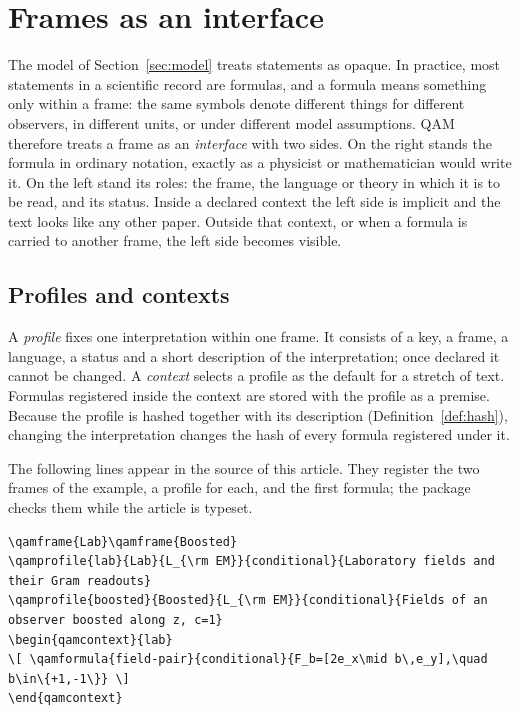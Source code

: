 \section{Frames as an interface}\label{sec:frames}

The model of Section~\ref{sec:model} treats statements as opaque. In practice, most statements in a scientific record are formulas,
and a formula means something only within a frame: the same symbols denote different things for different observers, in different
units, or under different model assumptions. QAM therefore treats a frame as an \emph{interface} with two sides. On the right stands
the formula in ordinary notation, exactly as a physicist or mathematician would write it. On the left stand its roles: the frame, the
language or theory in which it is to be read, and its status. Inside a declared context the left side is implicit and the text looks like
any other paper. Outside that context, or when a formula is carried to another frame, the left side becomes visible.

\subsection{Profiles and contexts}

A \emph{profile} fixes one interpretation within one frame. It consists of a key, a frame, a language, a status and a short description
of the interpretation; once declared it cannot be changed. A \emph{context} selects a profile as the default for a stretch of text.
Formulas registered inside the context are stored with the profile as a premise. Because the profile is hashed together with its
description (Definition~\ref{def:hash}), changing the interpretation changes the hash of every formula registered under it.

The following lines appear in the source of this article. They register the two frames of the example, a profile for each, and the
first formula; the package checks them while the article is typeset.

\begin{lstlisting}
\qamframe{Lab}\qamframe{Boosted}
\qamprofile{lab}{Lab}{L_{\rm EM}}{conditional}{Laboratory fields and their Gram readouts}
\qamprofile{boosted}{Boosted}{L_{\rm EM}}{conditional}{Fields of an observer boosted along z, c=1}
\begin{qamcontext}{lab}
\[ \qamformula{field-pair}{conditional}{F_b=[2e_x\mid b\,e_y],\quad b\in\{+1,-1\}} \]
\end{qamcontext}
\end{lstlisting}

